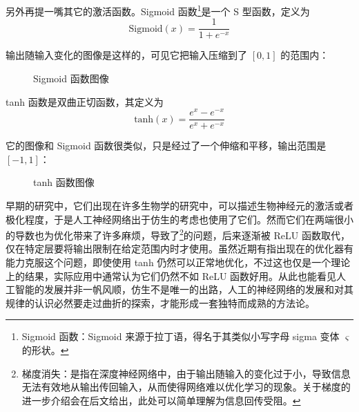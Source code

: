 另外再提一嘴其它的激活函数。Sigmoid 函数\footnote{Sigmoid 函数：Sigmoid 来源于拉丁语，得名于其类似小写字母 sigma 变体 $\varsigma$ 的形状。}是一个 S 型函数，定义为
\[
    \text{Sigmoid}(x) = \frac{1}{1 + e^{-x}}
\]

输出随输入变化的图像是这样的，可见它把输入压缩到了 $[0, 1]$ 的范围内：
\begin{figure}[H]
    \centering
    \caption{Sigmoid 函数图像}
\end{figure}

tanh 函数是双曲正切函数，其定义为
\[
    \text{tanh}(x) = \frac{e^x - e^{-x}}{e^x + e^{-x}}
\]

它的图像和 Sigmoid 函数很类似，只是经过了一个伸缩和平移，输出范围是 $[-1, 1]$：
\begin{figure}[H]
    \centering
    \caption{tanh 函数图像}
\end{figure}

早期的研究中，它们出现在许多生物学的研究中，可以描述生物神经元的激活或者极化程度，于是人工神经网络出于仿生的考虑也使用了它们。然而它们在两端很小的导数也为优化带来了许多麻烦，导致了\footnote{梯度消失：是指在深度神经网络中，由于输出随输入的变化过于小，导致信息无法有效地从输出传回输入，从而使得网络难以优化学习的现象。关于梯度的进一步介绍会在后文给出，此处可以简单理解为信息回传受阻。}的问题，后来逐渐被 ReLU 函数取代，仅在特定层要将输出限制在给定范围内时才使用。虽然近期有指出现在的优化器有能力克服这个问题，即使使用 tanh 仍然可以正常地优化，不过这也仅是一个理论上的结果，实际应用中通常认为它们仍然不如 ReLU 函数好用。从此也能看见人工智能的发展并非一帆风顺，仿生不是唯一的出路，人工的神经网络的发展和对其规律的认识必然要走过曲折的探索，才能形成一套独特而成熟的方法论。


